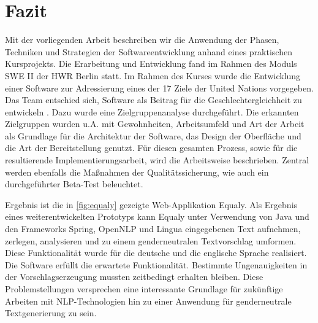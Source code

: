 \section{Fazit}
\label{sec:fazit}

Mit der vorliegenden Arbeit beschreiben wir die Anwendung der Phasen, Techniken und Strategien der Softwareentwicklung anhand eines praktischen Kursprojekts. Die Erarbeitung und Entwicklung fand im Rahmen des Moduls SWE II der HWR Berlin statt. Im Rahmen des Kurses wurde die Entwicklung einer Software zur Adressierung eines der 17 Ziele der United Nations vorgegeben. Das Team entschied sich, Software als Beitrag für die Geschlechtergleichheit zu entwickeln \cite{Un21}. Dazu wurde eine Zielgruppenanalyse durchgeführt. Die erkannten Zielgruppen wurden u.A. mit Gewohnheiten, Arbeitsumfeld und Art der Arbeit als Grundlage für die Architektur der Software, das Design der Oberfläche und die Art der Bereitstellung genutzt. Für diesen gesamten Prozess, sowie für die resultierende Implementierungsarbeit, wird die Arbeitsweise beschrieben. Zentral werden ebenfalls die Maßnahmen der Qualitätssicherung, wie auch ein durchgeführter Beta-Test beleuchtet.

Ergebnis ist die in \ref{fig:equaly} gezeigte Web-Applikation Equaly. Als Ergebnis eines weiterentwickelten Prototyps kann Equaly unter Verwendung von Java und den Frameworks Spring, OpenNLP und Lingua eingegebenen Text aufnehmen, zerlegen, analysieren und zu einem genderneutralen Textvorschlag umformen. Diese Funktionalität wurde für die deutsche und die englische Sprache realisiert. Die Software erfüllt die erwartete Funktionalität. Bestimmte Ungenauigkeiten in der Vorschlagserzeugung mussten zeitbedingt erhalten bleiben. Diese Problemstellungen versprechen eine interessante Grundlage für zukünftige Arbeiten mit NLP-Technologien hin zu einer Anwendung für genderneutrale Textgenerierung zu sein.